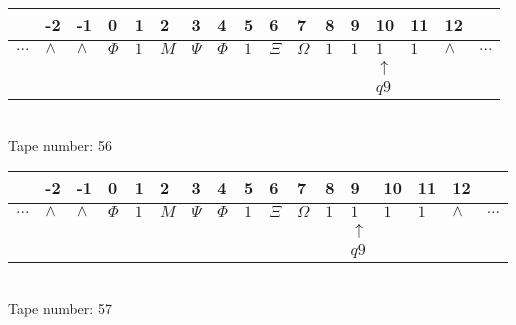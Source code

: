 \documentclass{article}
\begin{document}
\begin{table}[H]
\centering
\begin{tabular}{lllllllllllllllll}
 & -2 & -1 & 0 & 1 & 2 & 3 & 4 & 5 & 6 & 7 & 8 & 9 & 10 & 11 & 12 & \\
\hline
$...$ & \multicolumn{1}{|l|}{$\wedge$} & \multicolumn{1}{|l|}{$\wedge$} & \multicolumn{1}{|l|}{$\Phi$} & \multicolumn{1}{|l|}{$1$} & \multicolumn{1}{|l|}{$M$} & \multicolumn{1}{|l|}{$\Psi$} & \multicolumn{1}{|l|}{$\Phi$} & \multicolumn{1}{|l|}{$1$} & \multicolumn{1}{|l|}{$\Xi$} & \multicolumn{1}{|l|}{$\Omega$} & \multicolumn{1}{|l|}{$1$} & \multicolumn{1}{|l|}{$1$} & \multicolumn{1}{|l|}{$1$} & \multicolumn{1}{|l|}{$1$} & \multicolumn{1}{|l|}{$\wedge$} & $...$\\
\hline
&  &  &  &  &  &  &  &  &  &  &  &  & $\uparrow$ &  &  &  \\
&  &  &  &  &  &  &  &  &  &  &  &  & $ q9 $ &  &  &  \\
\end{tabular}
\\
Tape number: 56
\noindent\makebox[\linewidth]{\hdashrule{\textwidth}{1pt}{1pt}}\end{table}

\begin{table}[H]
\centering
\begin{tabular}{lllllllllllllllll}
 & -2 & -1 & 0 & 1 & 2 & 3 & 4 & 5 & 6 & 7 & 8 & 9 & 10 & 11 & 12 & \\
\hline
$...$ & \multicolumn{1}{|l|}{$\wedge$} & \multicolumn{1}{|l|}{$\wedge$} & \multicolumn{1}{|l|}{$\Phi$} & \multicolumn{1}{|l|}{$1$} & \multicolumn{1}{|l|}{$M$} & \multicolumn{1}{|l|}{$\Psi$} & \multicolumn{1}{|l|}{$\Phi$} & \multicolumn{1}{|l|}{$1$} & \multicolumn{1}{|l|}{$\Xi$} & \multicolumn{1}{|l|}{$\Omega$} & \multicolumn{1}{|l|}{$1$} & \multicolumn{1}{|l|}{$1$} & \multicolumn{1}{|l|}{$1$} & \multicolumn{1}{|l|}{$1$} & \multicolumn{1}{|l|}{$\wedge$} & $...$\\
\hline
&  &  &  &  &  &  &  &  &  &  &  & $\uparrow$ &  &  &  &  \\
&  &  &  &  &  &  &  &  &  &  &  & $ q9 $ &  &  &  &  \\
\end{tabular}
\\
Tape number: 57
\noindent\makebox[\linewidth]{\hdashrule{\textwidth}{1pt}{1pt}}\end{table}
\end{document}
